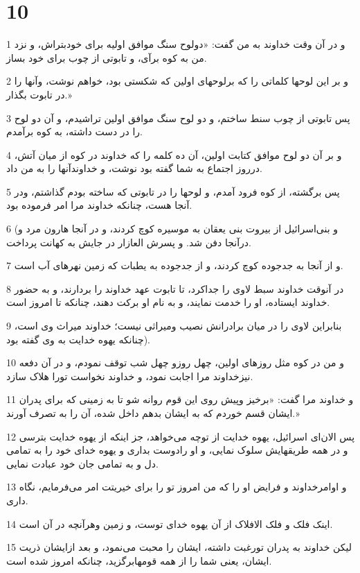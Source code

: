 \chapter{10}

\par 1 و در آن وقت خداوند به من گفت: «دولوح سنگ موافق اولیه برای خودبتراش، و نزد من به کوه برآی، و تابوتی از چوب برای خود بساز.
\par 2 و بر این لوحها کلماتی را که برلوحهای اولین که شکستی بود، خواهم نوشت، وآنها را در تابوت بگذار.»
\par 3 پس تابوتی از چوب سنط ساختم، و دو لوح سنگ موافق اولین تراشیدم، و آن دو لوح را در دست داشته، به کوه برآمدم.
\par 4 و بر آن دو لوح موافق کتابت اولین، آن ده کلمه را که خداوند در کوه از میان آتش، درروز اجتماع به شما گفته بود نوشت، و خداوندآنها را به من داد.
\par 5 پس برگشته، از کوه فرود آمدم، و لوحها را در تابوتی که ساخته بودم گذاشتم، ودر آنجا هست، چنانکه خداوند مرا امر فرموده بود.
\par 6 (و بنی‌اسرائیل از بیروت بنی یعقان به موسیره کوچ کردند، و در آنجا هارون مرد و درآنجا دفن شد. و پسرش العازار در جایش به کهانت پرداخت.
\par 7 و از آنجا به جدجوده کوچ کردند، و از جدجوده به یطبات که زمین نهرهای آب است.
\par 8 در آنوقت خداوند سبط لاوی را جداکرد، تا تابوت عهد خداوند را بردارند، و به حضور خداوند ایستاده، او را خدمت نمایند، و به نام او برکت دهند، چنانکه تا امروز است.
\par 9 بنابراین لاوی را در میان برادرانش نصیب ومیراثی نیست؛ خداوند میراث وی است، چنانکه یهوه خدایت به وی گفته بود).
\par 10 و من در کوه مثل روزهای اولین، چهل روزو چهل شب توقف نمودم، و در آن دفعه نیزخداوند مرا اجابت نمود، و خداوند نخواست تورا هلاک سازد.
\par 11 و خداوند مرا گفت: «برخیز وپیش روی این قوم روانه شو تا به زمینی که برای پدران ایشان قسم خوردم که به ایشان بدهم داخل شده، آن را به تصرف آورند.»
\par 12 پس الان‌ای اسرائیل، یهوه خدایت از توچه می‌خواهد، جز اینکه از یهوه خدایت بترسی و در همه طریقهایش سلوک نمایی، و او رادوست بداری و یهوه خدای خود را به تمامی دل و به تمامی جان خود عبادت نمایی.
\par 13 و اوامرخداوند و فرایض او را که من امروز تو را برای خیریتت امر می‌فرمایم، نگاه داری.
\par 14 اینک فلک و فلک الافلاک از آن یهوه خدای توست، و زمین وهرآنچه در آن است.
\par 15 لیکن خداوند به پدران تورغبت داشته، ایشان را محبت می‌نمود، و بعد ازایشان ذریت ایشان، یعنی شما را از همه قومهابرگزید، چنانکه امروز شده است.
